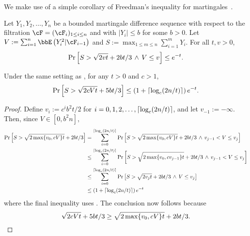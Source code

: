 We make use of a simple corollary of Freedman's inequality for
martingales~\citep[Theorem 1.6]{Fre75}.
\begin{theorem}
  \label{thm:freedman}
  Let $Y_1, Y_2, \dotsc, Y_n$ be a bounded martingale difference
  sequence with respect to the filtration $\cF = (\cF_i)_{1 \leq i
  \leq n}$ and with $|Y_i| \leq b$ for some $b>0$.
  Let $V := \sum_{i=1}^n \EE{Y_i^2|\cF_{i-1}}$ and $S := \max_{1 \leq
  m \leq n} \sum_{i=1}^m Y_i$.
  For all $t, v > 0$,
  \[
    \Pr\left[
      S > \sqrt{2vt} + 2bt/3
      \,\wedge\,
      V \leq v
    \right]
    \leq e^{-t}
    .
  \]
\end{theorem}
\begin{corollary}
  \label{cor:freedman}
  Under the same setting as , for any $t > 0$ and
  $c > 1$,
  \[
    \Pr\left[
      S > \sqrt{2cVt} + 5bt/3
    \right]
    \leq
    \left( 1 + \lceil\log_c(2n/t)\rceil \right)
    e^{-t}
    .
  \]
\end{corollary}
\begin{proof}
  Define $v_i := c^i b^2t/2$ for $i = 0, 1, 2, \dotsc, \lceil
  \log_c(2n/t) \rceil$, and let $v_{-1} := -\infty$.
  Then, since $V \in [0,b^2n]$,
  \begin{align*}
    \Pr\left[
      S > \sqrt{2\max\{v_0,cV\}t} + 2bt/3
    \right]
    & =
    \sum_{i=0}^{\lceil\log_c(2n/t)\rceil}
    \Pr\left[
      S > \sqrt{2\max\{v_0,cV\}t} + 2bt/3
      \,\wedge\, v_{j-1} < V \leq v_j
    \right]
    \\
    & \leq
    \sum_{i=0}^{\lceil\log_c(2n/t)\rceil}
    \Pr\left[
      S > \sqrt{2\max\{v_0,cv_{j-1}\}t} + 2bt/3
      \,\wedge\, v_{j-1} < V \leq v_j
    \right]
    \\
    & \leq
    \sum_{i=0}^{\lceil\log_c(2n/t)\rceil}
    \Pr\left[
      S > \sqrt{2v_jt} + 2bt/3
      \,\wedge\, V \leq v_j
    \right]
    \\
    & \leq
    \left( 1 + \lceil\log_c(2n/t)\rceil \right)
    e^{-t}
  \end{align*}
  where the final inequality uses .
  The conclusion now follows because
  \[
    \sqrt{2cVt} + 5bt/3
    \geq \sqrt{2\max\{v_0,cV\}t} + 2bt/3
    .
    \qedhere
  \]
\end{proof}

